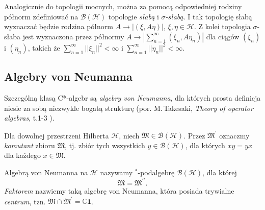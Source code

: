 Analogicznie do topologii mocnych, można za pomocą odpowiedniej rodziny
półnorm
zdefiniować na $\mathcal{B}(\mathcal{H})$ topologie \emph{słabą} i \emph{$\sigma$-słabą}.
I tak topologię słabą
wyznaczać będzie rodzina półnorm $A \rightarrow |(\xi, A \eta)|$,
$\xi, \eta
\in \mathcal{H}$. Z kolei topologia $\sigma$-słaba jest wyznaczona
przez półnormy
$A \rightarrow \left| \sum \limits_{n=1}^{\infty} (\xi_{n}, A
\eta_{n})
\right|$ dla ciągów $(\xi_{n})$ i $(\eta_{n})$, takich że
$\sum \limits_{n=1}^{\infty} ||\xi_{n}||^{2} < \infty$ i
$\sum \limits_{n=1}^{\infty} ||\eta_{n}||^{2} < \infty$.

\subsection{Algebry von Neumanna}
Szczególną klasą C*-algebr są \emph{algebry von Neumanna},
dla których prosta definicja niesie za sobą niezwykle bogatą strukturę
(por. M.\,Takesaki, \emph{Theory of operator algebras}, t.1-3
\cite{Takesaki1, Takesaki2, Takesaki3}).

Dla dowolnej przestrzeni Hilberta $\mathcal{H}$,
niech $\mathfrak{M} \in \mathcal{B}(\mathcal{H})$.
Przez $\mathfrak{M}^{\prime}$ oznaczmy \emph{komutant} zbioru $\mathfrak{M}$,
tj. zbiór tych wszystkich $y \in \mathcal{B}(\mathcal{H})$,
dla których $x y = y x$ dla każdego $x \in \mathfrak{M}$.

\begin{Definition}
    \label{def:vNalgebras}
    Algebrą von Neumanna na $\mathcal{H}$ nazywamy $^{*}$-podalgebrę
    $\mathcal{B}(\mathcal{H})$, dla której
    \begin{equation}
        \mathfrak{M} = \mathfrak{M}^{\prime \prime}.
    \end{equation}
    \emph{Faktorem} nazwiemy taką algebrę von Neumanna, która posiada
    trywialne \emph{centrum}, tzn.
    $\mathfrak{M} \cap \mathfrak{M}^{\prime} = \mathbb{C} \mathbf{1}$.
\end{Definition}

